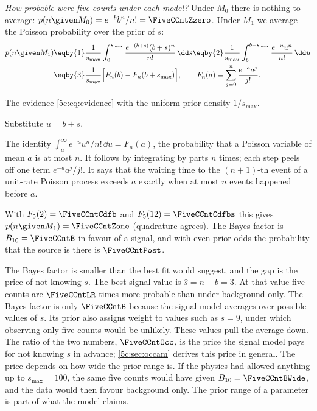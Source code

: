 \emph{How probable were five counts under each model?} Under $M_0$ there is nothing
to average: $p(n\given M_0)=e^{-b}b^n/n!=\FiveCCntZzero$. Under $M_1$ we average the
Poisson probability over the prior of $s$:
\begin{align}
  p(n\given M_1)
  &\eqby{1}\frac{1}{s_{\max}}\int_0^{s_{\max}}\frac{e^{-(b+s)}(b+s)^n}{n!}\,\dd s
   \eqby{2}\frac{1}{s_{\max}}\int_b^{b+s_{\max}}\frac{e^{-u}u^n}{n!}\,\dd u \nonumber\\
  &\eqby{3}\frac{1}{s_{\max}}\Bigl[F_n(b)-F_n(b+s_{\max})\Bigr],
  \qquad F_n(a)\equiv\sum_{j=0}^{n}\frac{e^{-a}a^j}{j!} .
  \label{5c:eq:counting}
\end{align}
\begin{explain}
  \item The evidence \eqref{5c:eq:evidence} with the uniform prior density
        $1/s_{\max}$.
  \item Substitute $u=b+s$.
  \item The identity $\int_a^\infty e^{-u}u^n/n!\,\dd u=F_n(a)$, the probability that
        a Poisson variable of mean $a$ is at most $n$. It follows by integrating by
        parts $n$ times; each step peels off one term $e^{-a}a^j/j!$. It says that the
        waiting time to the $(n+1)$-th event of a unit-rate Poisson process exceeds
        $a$ exactly when at most $n$ events happened before $a$.
\end{explain}
With $F_5(2)=\FiveCCntCdfb$ and $F_5(12)=\FiveCCntCdfbs$ this gives
$p(n\given M_1)=\FiveCCntZone$ (quadrature agrees). The Bayes factor is
$B_{10}=\FiveCCntB$ in favour of a signal, and with even prior odds the probability
that the source is there is $\FiveCCntPost$.

The Bayes factor is smaller than the best fit would suggest, and the gap is the price
of not knowing $s$. The best signal value is $\hat s=n-b=3$. At that value five
counts are $\FiveCCntLR$ times more probable than under background only. The Bayes
factor is only $\FiveCCntB$ because the signal model averages over possible
values of $s$. Its prior also assigns weight to values such as $s=9$, under
which observing only five counts would be unlikely. These values pull the
average down. The ratio of the two
numbers, $\FiveCCntOcc$, is the price the signal model pays for not knowing $s$ in
advance; \cref{5c:sec:occam} derives this price in general. The price depends on how
wide the prior range is. If the physics had allowed anything up to $s_{\max}=100$, the
same five counts would have given $B_{10}=\FiveCCntBWide$, and the data would then
favour background only. The prior range of a parameter is part of what the model
claims.

